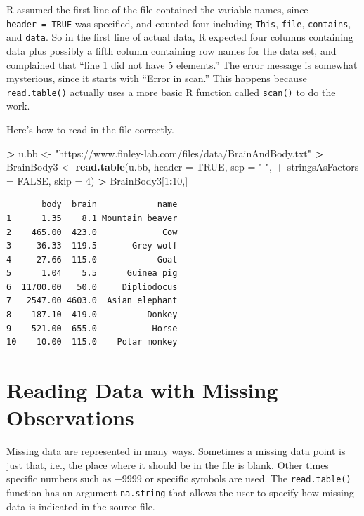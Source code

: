\documentclass[
]{krantz}
\makeatletter
\newenvironment{Shaded}{\begin{snugshade}}{\end{snugshade}}
\newcommand{\DataTypeTok}[1]{\textcolor[rgb]{0.27,0.27,0.27}{#1}}
\newcommand{\DecValTok}[1]{\textcolor[rgb]{0.06,0.06,0.06}{#1}}
\newcommand{\KeywordTok}[1]{\textcolor[rgb]{0.27,0.27,0.27}{\textbf{#1}}}
\newcommand{\NormalTok}[1]{#1}
\newcommand{\OperatorTok}[1]{\textcolor[rgb]{0.43,0.43,0.43}{\textbf{#1}}}
\newcommand{\OtherTok}[1]{\textcolor[rgb]{0.37,0.37,0.37}{#1}}
\newcommand{\StringTok}[1]{\textcolor[rgb]{0.5,0.5,0.5}{#1}}
\newenvironment{kframe}{%
\medskip{}
\setlength{\fboxsep}{.8em}
 \def\at@end@of@kframe{}%
 \ifinner\ifhmode%
  \def\at@end@of@kframe{\end{minipage}}%
  \begin{minipage}{\columnwidth}%
 \fi\fi%
 \def\FrameCommand##1{\hskip\@totalleftmargin \hskip-\fboxsep
 \colorbox{shadecolor}{##1}\hskip-\fboxsep
     \hskip-\linewidth \hskip-\@totalleftmargin \hskip\columnwidth}%
 \MakeFramed {\advance\hsize-\width
   \@totalleftmargin\z@ \linewidth\hsize
   \@setminipage}}%
 {\par\unskip\endMakeFramed%
 \at@end@of@kframe}
\renewenvironment{Shaded}{\begin{kframe}}{\end{kframe}}
\makeatother
\begin{document}
R assumed the first line of the file contained the variable names, since \texttt{header\ =\ TRUE} was specified, and counted four including \texttt{This}, \texttt{file}, \texttt{contains}, and \texttt{data}. So in the first line of actual data, R expected four columns containing data plus possibly a fifth column containing row names for the data set, and complained that ``line 1 did not have 5 elements.'' The error message is somewhat mysterious, since it starts with ``Error in scan.'' This happens because \texttt{read.table()} actually uses a more basic R function called \texttt{scan()} to do the work.

Here's how to read in the file correctly.

\begin{Shaded}
\begin{Highlighting}[]
\OperatorTok{\textgreater{}}\StringTok{ }\NormalTok{u.bb \textless{}{-}}\StringTok{ "https://www.finley{-}lab.com/files/data/BrainAndBody.txt"}
\OperatorTok{\textgreater{}}\StringTok{ }\NormalTok{BrainBody3 \textless{}{-}}\StringTok{ }\KeywordTok{read.table}\NormalTok{(u.bb, }\DataTypeTok{header =} \OtherTok{TRUE}\NormalTok{, }\DataTypeTok{sep =} \StringTok{" "}\NormalTok{, }
\OperatorTok{+}\StringTok{                          }\DataTypeTok{stringsAsFactors =} \OtherTok{FALSE}\NormalTok{, }\DataTypeTok{skip =} \DecValTok{4}\NormalTok{)}
\OperatorTok{\textgreater{}}\StringTok{ }\NormalTok{BrainBody3[}\DecValTok{1}\OperatorTok{:}\DecValTok{10}\NormalTok{,]}
\end{Highlighting}
\end{Shaded}

\begin{verbatim}
       body  brain            name
1      1.35    8.1 Mountain beaver
2    465.00  423.0             Cow
3     36.33  119.5       Grey wolf
4     27.66  115.0            Goat
5      1.04    5.5      Guinea pig
6  11700.00   50.0     Dipliodocus
7   2547.00 4603.0  Asian elephant
8    187.10  419.0          Donkey
9    521.00  655.0           Horse
10    10.00  115.0    Potar monkey
\end{verbatim}

\hypertarget{reading-data-with-missing-observations}{%
\section{Reading Data with Missing Observations}\label{reading-data-with-missing-observations}}

Missing data are represented in many ways. Sometimes a missing data point is just that, i.e., the place where it should be in the file is blank. Other times specific numbers such as \(-9999\) or specific symbols are used. The \texttt{read.table()} function has an argument \texttt{na.string} that allows the user to specify how missing data is indicated in the source file.
\end{document}
